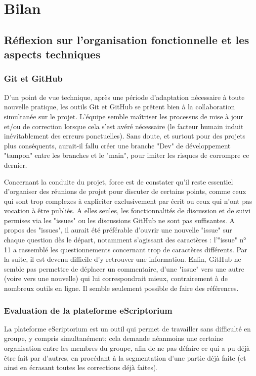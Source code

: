 \documentclass{article}
\begin{document}
	\section{Bilan}
	
	\subsection{Réflexion sur l'organisation fonctionnelle et les aspects techniques}
	\subsubsection{Git et GitHub}
	D'un point de vue technique, après une période d'adaptation nécessaire à toute nouvelle pratique, les outils Git et GitHub se prêtent bien à la collaboration simultanée sur le projet. L'équipe semble maîtriser les processus de mise à jour et/ou de correction lorsque cela s'est avéré nécessaire (le facteur humain induit inévitablement des erreurs ponctuelles). Sans doute, et surtout pour des projets plus conséquents, aurait-il fallu créer une branche "Dev" de développement "tampon" entre les branches et le "main", pour imiter les risques de corrompre ce dernier.
	
	
	Concernant la conduite du projet, force est de constater qu'il reste essentiel d'organiser des réunions de projet pour discuter de certains points, comme ceux qui sont trop complexes à expliciter exclusivement par écrit ou ceux qui n'ont pas vocation à être publiés. A elles seules, les fonctionnalités de discussion et de suivi permises via les "issues" ou les discussions GitHub ne sont pas suffisantes.
	A propos des "issues", il aurait été préférable d'ouvrir une nouvelle "issue" sur chaque question dès le départ, notamment s'agissant des caractères : l'"issue" n° 11 a rassemblé les questionnements concernant trop de caractères différents. Par la suite, il est devenu difficile d'y retrouver une information. Enfin, GitHub ne semble pas permettre de déplacer un commentaire, d'une "issue" vers une autre (voire vers une nouvelle) qui lui correspondrait mieux, contrairement à de nombreux outils en ligne. Il semble seulement possible de faire des références.
	
	
	\subsubsection{Evaluation de la plateforme eScriptorium}
	
	La plateforme eScriptorium est un outil qui permet de travailler sans difficulté en groupe, y compris simultanément; cela demande néanmoins une certaine organisation entre les membres du groupe, afin de ne pas défaire ce qui a pu déjà être fait par d’autres, en procédant à la segmentation d’une partie déjà faite (et ainsi en écrasant toutes les corrections déjà faites).
	
\end{document}
